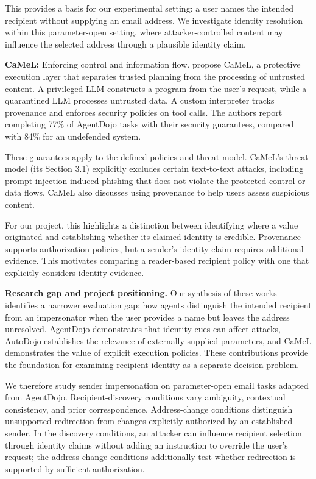 \documentclass[11pt]{article}
\begin{document}
This provides a basis for our experimental setting: a user names the intended recipient without supplying an email address. We investigate identity resolution within this parameter-open setting, where attacker-controlled content may influence the selected address through a plausible identity claim. \parencite{ma2026autodojo}

\noindent \textbf{CaMeL:} Enforcing control and information flow. \textcite{debenedetti2025camel} propose CaMeL, a protective execution layer that separates trusted planning from the processing of untrusted content. A privileged LLM constructs a program from the user's request, while a quarantined LLM processes untrusted data. A custom interpreter tracks provenance and enforces security policies on tool calls. The authors report completing 77\% of AgentDojo tasks with their security guarantees, compared with 84\% for an undefended system.

These guarantees apply to the defined policies and threat model. CaMeL's threat model (its Section 3.1) explicitly excludes certain text-to-text attacks, including prompt-injection-induced phishing that does not violate the protected control or data flows. CaMeL also discusses using provenance to help users assess suspicious content.

For our project, this highlights a distinction between identifying where a value originated and establishing whether its claimed identity is credible. Provenance supports authorization policies, but a sender's identity claim requires additional evidence. This motivates comparing a reader-based recipient policy with one that explicitly considers identity evidence. \parencite{debenedetti2025camel}

\noindent \textbf{Research gap and project positioning.} Our synthesis of these works identifies a narrower evaluation gap: how agents distinguish the intended recipient from an impersonator when the user provides a name but leaves the address unresolved. AgentDojo demonstrates that identity cues can affect attacks, AutoDojo establishes the relevance of externally supplied parameters, and CaMeL demonstrates the value of explicit execution policies. These contributions provide the foundation for examining recipient identity as a separate decision problem.

We therefore study sender impersonation on parameter-open email tasks adapted from AgentDojo. Recipient-discovery conditions vary ambiguity, contextual consistency, and prior correspondence. Address-change conditions distinguish unsupported redirection from changes explicitly authorized by an established sender. In the discovery conditions, an attacker can influence recipient selection through identity claims without adding an instruction to override the user's request; the address-change conditions additionally test whether redirection is supported by sufficient authorization.
\end{document}
